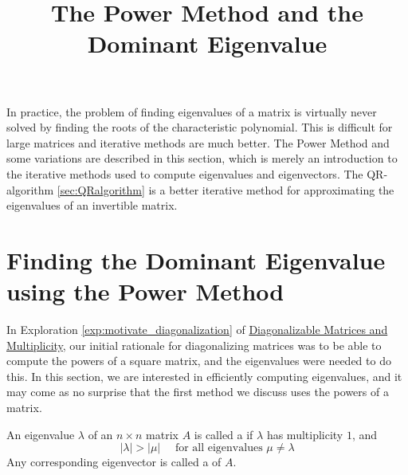 \documentclass{ximera}
\title{The Power Method and the Dominant Eigenvalue} \license{CC BY-NC-SA 4.0}
\begin{document}
\begin{abstract}
\end{abstract}
\maketitle

In practice, the problem of finding
eigenvalues of a matrix is virtually never solved by finding the roots
of the characteristic polynomial. This is difficult for large matrices
and iterative methods are much better. The Power Method and some variations are described in this section, which is merely an introduction to the iterative methods used to compute eigenvalues and eigenvectors.  The QR-algorithm \ref{sec:QRalgorithm} is a better iterative method for approximating the eigenvalues of an invertible matrix. 

\section*{Finding the Dominant Eigenvalue using the Power Method}

In Exploration \ref{exp:motivate_diagonalization} of \href{https://ximera.osu.edu/oerlinalg/LinearAlgebra/EIG-0050/main}{Diagonalizable Matrices and Multiplicity},
 our initial rationale for diagonalizing matrices was to be able to
compute the powers of a square matrix, and the eigenvalues were needed
to do this. In this section, we are interested in efficiently computing
eigenvalues, and it may come as no surprise that the first method we
discuss uses the powers of a matrix.

\begin{definition}\label{def:dominant ew,ev}
An eigenvalue $\lambda$ of an $n \times n$ matrix $A$ is called a  if $\lambda$ has multiplicity $1$, and
\begin{equation*}
|\lambda| > |\mu| \quad \mbox{ for all eigenvalues } \mu \neq \lambda
\end{equation*}
Any corresponding eigenvector is called a  of $A$.
\end{definition}
\end{document}
